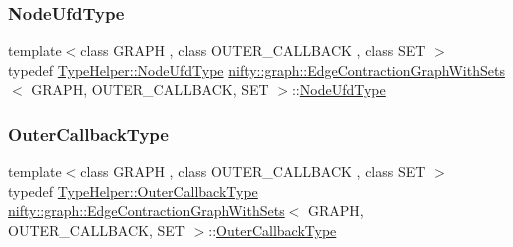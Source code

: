 \subsubsection{\texorpdfstring{Node\+Ufd\+Type}{NodeUfdType}}
{\footnotesize\ttfamily template$<$class G\+R\+A\+PH , class O\+U\+T\+E\+R\+\_\+\+C\+A\+L\+L\+B\+A\+CK , class S\+ET $>$ \\
typedef \hyperlink{structnifty_1_1graph_1_1EdgeContractionGraphWithSetsHelper_a254e8886638750a06342b813be34344d}{Type\+Helper\+::\+Node\+Ufd\+Type} \hyperlink{classnifty_1_1graph_1_1EdgeContractionGraphWithSets}{nifty\+::graph\+::\+Edge\+Contraction\+Graph\+With\+Sets}$<$ G\+R\+A\+PH, O\+U\+T\+E\+R\+\_\+\+C\+A\+L\+L\+B\+A\+CK, S\+ET $>$\+::\hyperlink{classnifty_1_1graph_1_1EdgeContractionGraphWithSets_ae340ffb867bc1eb19b139e879174607e}{Node\+Ufd\+Type}}

\mbox{\label{classnifty_1_1graph_1_1EdgeContractionGraphWithSets_a2f741cfabfa1fb4c5bfc75df557c1d12}} 
\subsubsection{\texorpdfstring{Outer\+Callback\+Type}{OuterCallbackType}}
{\footnotesize\ttfamily template$<$class G\+R\+A\+PH , class O\+U\+T\+E\+R\+\_\+\+C\+A\+L\+L\+B\+A\+CK , class S\+ET $>$ \\
typedef \hyperlink{structnifty_1_1graph_1_1EdgeContractionGraphWithSetsHelper_a3e0b97cbc8de91c57e3dc83860edda69}{Type\+Helper\+::\+Outer\+Callback\+Type} \hyperlink{classnifty_1_1graph_1_1EdgeContractionGraphWithSets}{nifty\+::graph\+::\+Edge\+Contraction\+Graph\+With\+Sets}$<$ G\+R\+A\+PH, O\+U\+T\+E\+R\+\_\+\+C\+A\+L\+L\+B\+A\+CK, S\+ET $>$\+::\hyperlink{classnifty_1_1graph_1_1EdgeContractionGraphWithSets_a2f741cfabfa1fb4c5bfc75df557c1d12}{Outer\+Callback\+Type}}

\mbox{\label{classnifty_1_1graph_1_1EdgeContractionGraphWithSets_aeb3c8839879c1e126ceaca6bdfdff008}} 
